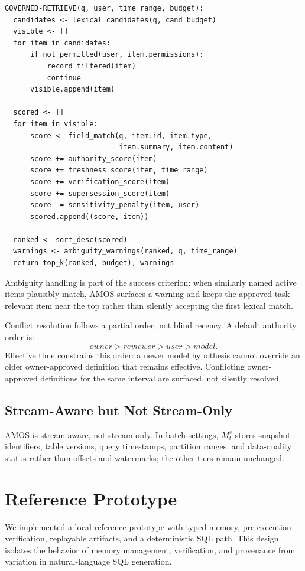 \documentclass[sigconf,nonacm]{acmart}
\newcommand{\amos}{\textsc{AMOS}\xspace}
\begin{document}
{\scriptsize
\begin{verbatim}
GOVERNED-RETRIEVE(q, user, time_range, budget):
  candidates <- lexical_candidates(q, cand_budget)
  visible <- []
  for item in candidates:
      if not permitted(user, item.permissions):
          record_filtered(item)
          continue
      visible.append(item)

  scored <- []
  for item in visible:
      score <- field_match(q, item.id, item.type,
                           item.summary, item.content)
      score += authority_score(item)
      score += freshness_score(item, time_range)
      score += verification_score(item)
      score += supersession_score(item)
      score -= sensitivity_penalty(item, user)
      scored.append((score, item))

  ranked <- sort_desc(scored)
  warnings <- ambiguity_warnings(ranked, q, time_range)
  return top_k(ranked, budget), warnings
\end{verbatim}
}

Ambiguity handling is part of the success criterion: when similarly named active items plausibly match, \amos surfaces a warning and keeps the approved task-relevant item near the top rather than silently accepting the first lexical match.

Conflict resolution follows a partial order, not blind recency. A default authority order is:
\begin{equation}
    owner > reviewer > user > model.
\end{equation}
Effective time constrains this order: a newer model hypothesis cannot override an older owner-approved definition that remains effective. Conflicting owner-approved definitions for the same interval are surfaced, not silently resolved.

\subsection{Stream-Aware but Not Stream-Only}
\amos is stream-aware, not stream-only. In batch settings, $M^s_t$ stores snapshot identifiers, table versions, query timestamps, partition ranges, and data-quality status rather than offsets and watermarks; the other tiers remain unchanged.

\section{Reference Prototype}

We implemented a local reference prototype with typed memory, pre-execution verification, replayable artifacts, and a deterministic SQL path. This design isolates the behavior of memory management, verification, and provenance from variation in natural-language SQL generation.
\end{document}
